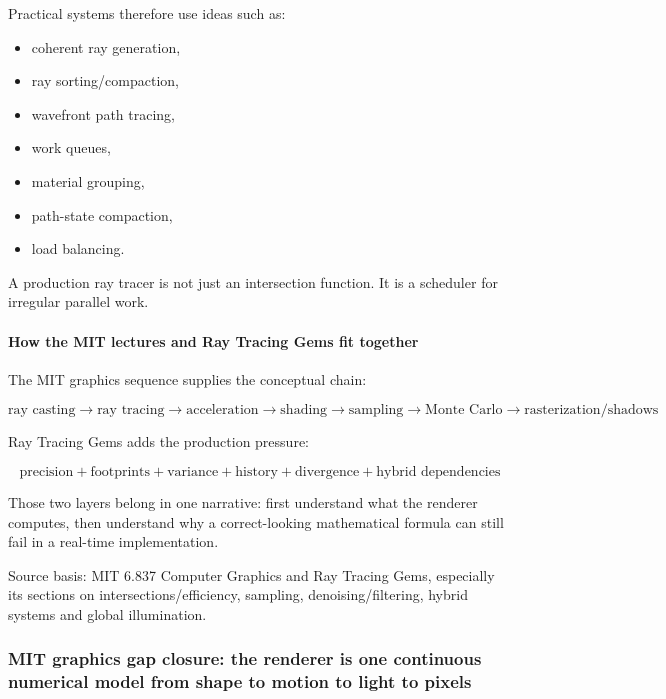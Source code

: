 Practical systems therefore use ideas such as:

\begin{itemize}
\tightlist
\item
  coherent ray generation,
\item
  ray sorting/compaction,
\item
  wavefront path tracing,
\item
  work queues,
\item
  material grouping,
\item
  path-state compaction,
\item
  load balancing.
\end{itemize}

A production ray tracer is not just an intersection function. It is a scheduler for irregular parallel work.

\paragraph{How the MIT lectures and Ray Tracing Gems fit together}\label{03-visual-computing-i-ch001-how-the-mit-lectures-and-ray-tracing-gems-fit-together}

\hypertarget{03-visual-computing-i-ch001-how-the-mit-lectures-and-ray-tracing-gems-fit-together}{}

The MIT graphics sequence supplies the conceptual chain:

\[
\text{ray casting}
\rightarrow
\text{ray tracing}
\rightarrow
\text{acceleration}
\rightarrow
\text{shading}
\rightarrow
\text{sampling}
\rightarrow
\text{Monte Carlo}
\rightarrow
\text{rasterization/shadows}
\]

Ray Tracing Gems adds the production pressure:

\[
\boxed{
\text{precision}
+
\text{footprints}
+
\text{variance}
+
\text{history}
+
\text{divergence}
+
\text{hybrid dependencies}
}
\]

Those two layers belong in one narrative: first understand what the renderer computes, then understand why a correct-looking mathematical formula can still fail in a real-time implementation.

Source basis: MIT 6.837 Computer Graphics and Ray Tracing Gems, especially its sections on intersections/efficiency, sampling, denoising/filtering, hybrid systems and global illumination.

\subsubsection{MIT graphics gap closure: the renderer is one continuous numerical model from shape to motion to light to pixels}\label{03-visual-computing-i-ch001-mit-graphics-gap-closure-the-renderer-is-one-continuous-numerical-model-from-shape-to-motion-to-light-to-pixels}

